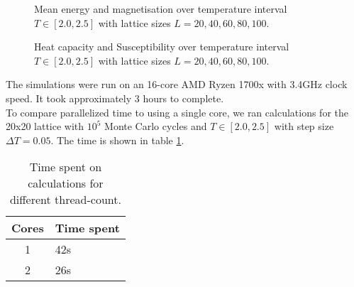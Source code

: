 \documentclass[../main.tex]{subfiles}
\begin{document}
\begin{figure}[!h]
  \caption{Mean energy and magnetisation over temperature interval $T \in [2.0, 2.5]$ with lattice sizes $L = {20, 40, 60, 80, 100}$.}
  \label{fig:results-energy-magnetisation}
\end{figure}
\FloatBarrier

\begin{figure}[!h]
  \caption{Heat capacity and Susceptibility over temperature interval $T \in [2.0, 2.5]$ with lattice sizes $L = {20, 40, 60, 80, 100}$.}
  \label{fig:results-heatcap-suscep}
\end{figure}
\FloatBarrier
The simulations were run on an 16-core AMD Ryzen 1700x with 3.4GHz clock speed. It took approximately 3 hours to complete.\\
To compare parallelized time to using a single core, we ran calculations for the 20x20 lattice with $10^5$ Monte Carlo cycles and $T \in [2.0, 2.5]$ with step size $\Delta T = 0.05$. The time is shown in table \ref{tab:results-MPI}.

\begin{table}[!h]
  \begin{center}
    \begin{tabular}{|c| l|}
      \hline
      Cores & Time spent\\
      \hline
      1 & 42s\\
      2 & 26s\\
      \hline
    \end{tabular}
    \caption{Time spent on calculations for different thread-count.}
    \label{tab:results-MPI}
  \end{center}
\end{table}
\FloatBarrier
\end{document}
